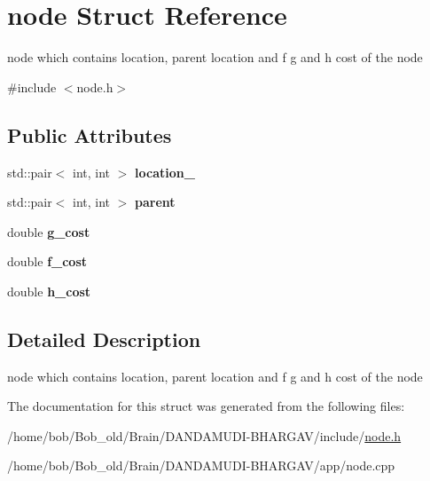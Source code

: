 \hypertarget{structnode}{}\section{node Struct Reference}
\label{structnode}


node which contains location, parent location and f g and h cost of the node  




{\ttfamily \#include $<$node.\+h$>$}

\subsection*{Public Attributes}
\begin{DoxyCompactItemize}
\item 
std\+::pair$<$ int, int $>$ {\bfseries location\+\_\+}\hypertarget{structnode_aec49942cb16018b007a5f4f8b1ed92f7}{}\label{structnode_aec49942cb16018b007a5f4f8b1ed92f7}

\item 
std\+::pair$<$ int, int $>$ {\bfseries parent}\hypertarget{structnode_a8521a90e9164e9e237f423db7e67988f}{}\label{structnode_a8521a90e9164e9e237f423db7e67988f}

\item 
double {\bfseries g\+\_\+cost}\hypertarget{structnode_ae2bca0303dfd57cc808bf54112057ca9}{}\label{structnode_ae2bca0303dfd57cc808bf54112057ca9}

\item 
double {\bfseries f\+\_\+cost}\hypertarget{structnode_a06dade3de13d5c31488cc7e65fa805dc}{}\label{structnode_a06dade3de13d5c31488cc7e65fa805dc}

\item 
double {\bfseries h\+\_\+cost}\hypertarget{structnode_a099b281e5e4c6cb4811383c252a09a28}{}\label{structnode_a099b281e5e4c6cb4811383c252a09a28}

\end{DoxyCompactItemize}


\subsection{Detailed Description}
node which contains location, parent location and f g and h cost of the node 

The documentation for this struct was generated from the following files\+:\begin{DoxyCompactItemize}
\item 
/home/bob/\+Bob\+\_\+old/\+Brain/\+D\+A\+N\+D\+A\+M\+U\+D\+I-\/\+B\+H\+A\+R\+G\+A\+V/include/\hyperlink{node_8h}{node.\+h}\item 
/home/bob/\+Bob\+\_\+old/\+Brain/\+D\+A\+N\+D\+A\+M\+U\+D\+I-\/\+B\+H\+A\+R\+G\+A\+V/app/node.\+cpp\end{DoxyCompactItemize}
